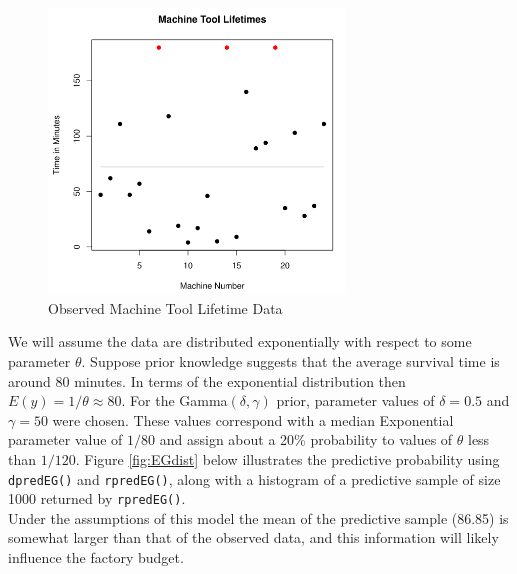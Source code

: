 \documentclass[12pt, a4paper]{article}
\begin{document}
\begin{figure}[h]
  \centering
  \includegraphics[width=0.7\textwidth]{./Graphics/ExamplePlots/EG_TimeData}
  \caption{Observed Machine Tool Lifetime Data}
  \label{fig:EG_Data}
\end{figure}

\vspace{2cm}


\noindent We will assume the data are distributed exponentially with respect to some parameter $\theta$.  Suppose prior knowledge suggests that the average survival time is around 80 minutes.  In terms of the exponential distribution then $E(y) = 1/\theta \approx 80$.  For the Gamma$(\delta,\gamma)$ prior, parameter values of $\delta = 0.5$ and $\gamma=50$ were chosen. These values correspond with a median Exponential parameter value of $1/80$ and assign about a 20\% probability to values of $\theta$ less than $1/120$. Figure \ref{fig:EGdist} below illustrates the predictive probability using \texttt{dpredEG()} and \texttt{rpredEG()}, along with a histogram of a predictive sample of size 1000 returned by \texttt{rpredEG()}.\\

\noindent Under the assumptions of this model the mean of the predictive sample (86.85) is somewhat larger than that of the observed data, and this information will likely influence the factory budget.
\end{document}

